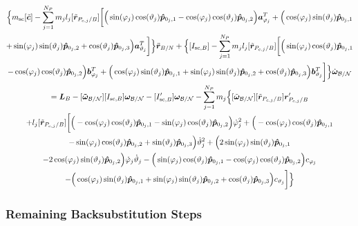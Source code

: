 \begin{multline}
	\Big\{m_{\text{sc}}[\tilde{\bm{c}}] - \sum\limits_{j=1}^{N_P}m_j l_j [\tilde{\bm{r}}_{P_{c,j}/B}] \bigg[
	\Big(\sin(\varphi_j)\cos(\vartheta_j)\bm{\hat{p}}_{0_j,1}-\cos(\varphi_j)\cos(\vartheta_j)\bm{\hat{p}}_{0_j,2}\Big)\bm a_{\varphi_j}^T
	+\Big(\cos(\varphi_j)\sin(\vartheta_j)\bm{\hat{p}}_{0_j,1}\\+\sin(\varphi_j)\sin(\vartheta_j)\bm{\hat{p}}_{0_j,2}+\cos(\vartheta_j)\bm{\hat{p}}_{0_j,3} \Big)\bm a_{\vartheta_j}^T
	\bigg]
	\Big\}\ddot{\bm r}_{B/N}
	+\Big\{[I_{\text{sc},B}] - \sum\limits_{j=1}^{N_P}m_j l_j [\tilde{\bm{r}}_{P_{c,j}/B}] \bigg[
	\Big(\sin(\varphi_j)\cos(\vartheta_j)\bm{\hat{p}}_{0_j,1}\\-\cos(\varphi_j)\cos(\vartheta_j)\bm{\hat{p}}_{0_j,2}\Big)\bm b_{\varphi_j}^T
	+\Big(\cos(\varphi_j)\sin(\vartheta_j)\bm{\hat{p}}_{0_j,1}
	+\sin(\varphi_j)\sin(\vartheta_j)\bm{\hat{p}}_{0_j,2}+\cos(\vartheta_j)\bm{\hat{p}}_{0_j,3} \Big)\bm b_{\vartheta_j}^T
	\bigg]
	\Big\}\dot{\bm\omega}_{\cal B/N}
	\\=
	\bm{L}_B-[\bm{\tilde{\omega}}_{\cal B/N}] [I_{\text{sc},B}] \bm\omega_{\cal B/N}
	- [I'_{\text{sc},B}] \bm\omega_{\cal B/N}- \sum\limits_{j=1}^{N_P} m_j \Big\{[\tilde{\bm\omega}_{\cal B/N}] [\tilde{\bm{r}}_{P_{c,j}/B}] \bm{r}'_{P_{c,j}/B}
	\\+l_j[\tilde{\bm{r}}_{P_{c,j}/B}]\bigg[
	\Big(-\cos(\varphi_j)\cos(\vartheta_j)\bm{\hat{p}}_{0_j,1}-\sin(\varphi_j)\cos(\vartheta_j)\bm{\hat{p}}_{0_j,2}\Big)\dot{\varphi}_j^2
	+\Big(-\cos(\varphi_j)\cos(\vartheta_j)\bm{\hat{p}}_{0_j,1}\\-\sin(\varphi_j)\cos(\vartheta_j)\bm{\hat{p}}_{0_j,2}+\sin(\vartheta_j)\bm{\hat{p}}_{0_j,3} \Big)\dot{\vartheta}_j^2 +
	\Big(2\sin(\varphi_j)\sin(\vartheta_j)\bm{\hat{p}}_{0_j,1} \\-2\cos(\varphi_j)\sin(\vartheta_j)\bm{\hat{p}}_{0_j,2}\Big)\dot{\varphi}_j\dot{\vartheta}_j
	- \Big(\sin(\varphi_j)\cos(\vartheta_j)\bm{\hat{p}}_{0_j,1} -\cos(\varphi_j)\cos(\vartheta_j)\bm{\hat{p}}_{0_j,2}\Big)c_{\varphi_j} \\-   \Big(\cos(\varphi_j)\sin(\vartheta_j)\bm{\hat{p}}_{0_j,1}+\sin(\varphi_j)\sin(\vartheta_j)\bm{\hat{p}}_{0_j,2}+\cos(\vartheta_j)\bm{\hat{p}}_{0_j,3}\Big) c_{\vartheta_j}
	\bigg]\Big\}
	\label{eq:Final7}
\end{multline}

\subsubsection{Remaining Backsubstitution Steps}

